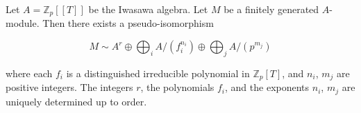 Let $A = \mathbb{Z}_p[[T]]$ be the Iwasawa algebra. Let $M$ be a finitely generated $A$-module. Then there exists a pseudo-isomorphism

$$
M \sim A^r \oplus \bigoplus_{i} A/(f_i^{n_i}) \oplus \bigoplus_{j} A/(p^{m_j})
$$

where each $f_i$ is a distinguished irreducible polynomial in $\mathbb{Z}_p[T]$, and $n_i$, $m_j$ are positive integers. The integers $r$, the polynomials $f_i$, and the exponents $n_i$, $m_j$ are uniquely determined up to order.
